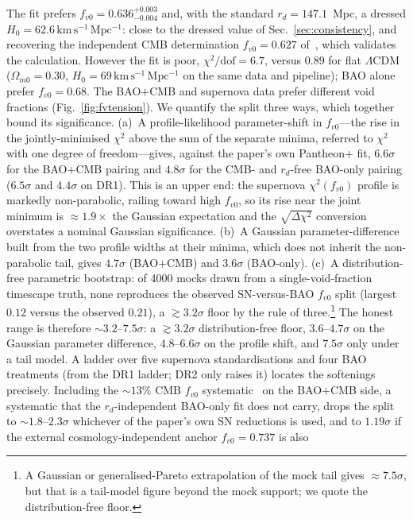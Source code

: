 \documentclass[aps,prd,twocolumn,nofootinbib,superscriptaddress,floatfix]{revtex4-2}
\newcommand{\Ho}{H_{0}}
\newcommand{\fvo}{f_{v0}}
\newcommand{\kmsmpc}{\,\mathrm{km\,s^{-1}\,Mpc^{-1}}}
\newcommand{\Lcdm}{\Lambda\mathrm{CDM}}
\begin{document}
The fit prefers $\fvo=0.636^{+0.003}_{-0.004}$ and, with the standard $r_d=147.1$~Mpc, a
dressed $\Ho=62.6\kmsmpc$: close to the dressed value of
Sec.~\ref{sec:consistency}, and recovering the independent CMB determination
$\fvo=0.627$ of~\cite{Nazer2015}, which validates the calculation. However the
fit is poor, $\chi^2/\mathrm{dof}=6.7$, versus $0.89$ for flat $\Lcdm$
($\Omega_{m0}=0.30$, $\Ho=69\kmsmpc$ on the same data and pipeline); BAO alone
prefer $\fvo=0.68$. The BAO$+$CMB and supernova data prefer different void
fractions (Fig.~\ref{fig:fvtension}). We quantify the split three ways, which together
bound its significance. (a)~A profile-likelihood parameter-shift in $\fvo$---the rise in
the jointly-minimised $\chi^2$ above the sum of the separate minima, referred to $\chi^2$
with one degree of freedom---gives, against the paper's own Pantheon$+$ fit, $6.6\sigma$
for the BAO$+$CMB pairing and $4.8\sigma$ for the CMB- and $r_d$-free BAO-only pairing
($6.5\sigma$ and $4.4\sigma$ on DR1). This is an upper end: the supernova $\chi^2(\fvo)$
profile is markedly non-parabolic, railing toward high $\fvo$, so its rise near the joint
minimum is $\approx1.9\times$ the Gaussian expectation and the $\sqrt{\Delta\chi^2}$
conversion overstates a nominal Gaussian significance. (b)~A Gaussian parameter-difference
built from the two profile widths at their minima, which does not inherit the
non-parabolic tail, gives $4.7\sigma$ (BAO$+$CMB) and $3.6\sigma$ (BAO-only). (c)~A
distribution-free parametric bootstrap: of 4000 mocks drawn from a single-void-fraction
timescape truth, none reproduces the observed SN-versus-BAO $\fvo$ split (largest $0.12$
versus the observed $0.21$), a $\gtrsim3.2\sigma$ floor by the rule of
three.\footnote{A Gaussian or generalised-Pareto extrapolation of the mock tail gives
$\approx7.5\sigma$, but that is a tail-model figure beyond the mock support; we quote the
distribution-free floor.} The honest range is therefore $\sim3.2$--$7.5\sigma$: a
$\gtrsim3.2\sigma$ distribution-free floor, $3.6$--$4.7\sigma$ on the Gaussian parameter
difference, $4.8$--$6.6\sigma$ on the profile shift, and $7.5\sigma$ only under a tail
model. A ladder over five supernova standardisations and four BAO treatments (from the
DR1 ladder; DR2 only raises it) locates the softenings precisely. Including the
$\sim\!13\%$ CMB $\fvo$ systematic~\cite{Nazer2015} on the BAO$+$CMB side, a systematic
that the $r_d$-independent BAO-only fit does not carry, drops the split to
$\sim1.8$--$2.3\sigma$ whichever of the paper's own SN reductions is used, and to
$1.19\sigma$ if the external cosmology-independent anchor $\fvo=0.737$ is also
\end{document}
